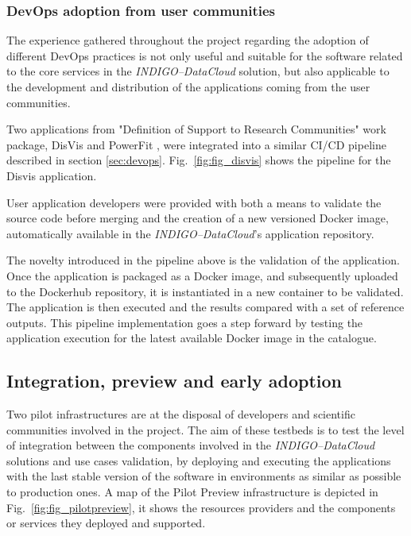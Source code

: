 \documentclass[journal]{IEEEtran}
\begin{document}
\subsubsection{DevOps adoption from user communities}

The experience gathered throughout the project regarding the adoption of
different DevOps practices is not only useful and suitable for the software related
to the core services in the {\sl INDIGO--DataCloud} solution, but also applicable to the
development and distribution of the applications coming from the user communities.

Two applications from "Definition of Support to Research Communities" work package,
DisVis \cite{disvis} and PowerFit \cite{powerfit}, were
integrated into a similar CI/CD pipeline described in section \ref{sec:devops}.
Fig.~\ref{fig:fig_disvis} shows the pipeline for the Disvis application.

User application developers were provided with both a means to validate the
source code before merging and the creation of a new versioned Docker image,
automatically available in the {\sl INDIGO--DataCloud}'s application repository.

The novelty introduced in the pipeline above is the validation of the application.
Once the application is packaged as a Docker image, and subsequently uploaded
to the Dockerhub repository, it is instantiated in a new container to be validated.
The application is then executed and the results compared with a set of reference outputs.
This pipeline implementation goes a step forward by testing the application
execution for the latest available Docker image in the catalogue.


\subsection{Integration, preview and early adoption}

Two pilot infrastructures are at the disposal of developers and scientific
communities involved in the project. The aim of these testbeds is to test the
level of integration between the components involved in the {\sl INDIGO--DataCloud}
solutions and use cases validation, by deploying and executing the applications
with the last stable version of the software in environments as similar as
possible to production ones. A map of the Pilot Preview
infrastructure is depicted in Fig.~\ref{fig:fig_pilotpreview}, it shows the
resources providers and the components or services they deployed and supported.
\end{document}
